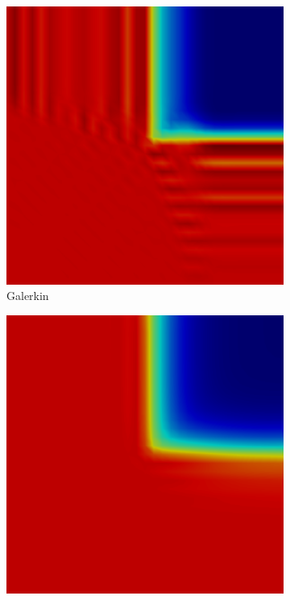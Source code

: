 \documentclass{beamer}
\begin{document}
\begin{frame}
\begin{figure}[h]
\begin{subfigure}{0.3\textwidth}
      \includegraphics[width=\textwidth]{./figures/skew_Gal.png}
      \caption{Galerkin}
   \end{subfigure}
   \begin{subfigure}{0.3\textwidth}
      \includegraphics[width=\textwidth]{./figures/skew_GalFCT.png}

\end{subfigure}
\end{figure}
\end{frame}
\end{document}
